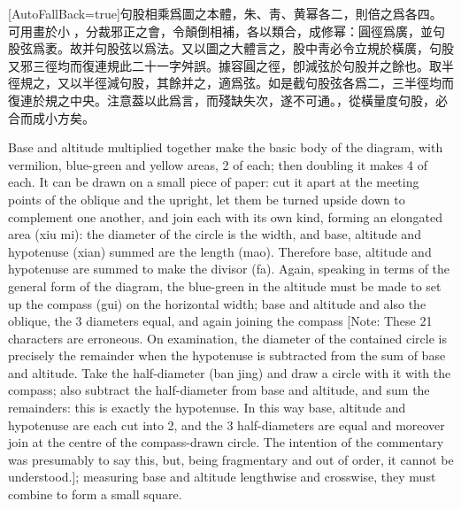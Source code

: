 \documentclass[11pt]{article}
\newcommand{\zhsmall}{\footnotesize\color{black!70}}
\newcommand{\unitlabel}[1]{\marginpar{\raggedleft\tiny\color{gray}#1}}
\newenvironment{unitzh}{\par\CJKfontspec{Noto Serif CJK SC}[AutoFallBack=true]\large\linespread{1.25}\selectfont}{\par}
\newenvironment{uniten}{\par\small\color{black!85}}{\par\medskip}
\begin{document}
\begin{unitzh}\unitlabel{jiuzhang-042.4}句股相乘爲圖之本體，朱、靑、黄幂各二，則倍之爲各四。可用畫於小𥿄，分裁邪正之會，令顛倒相補，各以類合，成修幂：圓徑爲廣，並句股弦爲袤。故并句股弦以爲法。又以圖之大體言之，股中靑必令立規於橫廣，句股又邪三徑均而復連規{\zhsmall 此二十一字舛誤。據容圓之徑，卽減弦於句股并之餘也。取半徑規之，又以半徑減句股，其餘并之，適爲弦。如是截句股弦各爲二，三半徑均而復連於規之中央。注意葢以此爲言，而殘缺失次，遂不可通。}，從橫量度句股，必合而成小方矣。\end{unitzh}
\begin{uniten}Base and altitude multiplied together make the basic body of the diagram, with vermilion, blue-green and yellow areas, 2 of each; then doubling it makes 4 of each. It can be drawn on a small piece of paper: cut it apart at the meeting points of the oblique and the upright, let them be turned upside down to complement one another, and join each with its own kind, forming an elongated area (xiu mi): the diameter of the circle is the width, and base, altitude and hypotenuse (xian) summed are the length (mao). Therefore base, altitude and hypotenuse are summed to make the divisor (fa). Again, speaking in terms of the general form of the diagram, the blue-green in the altitude must be made to set up the compass (gui) on the horizontal width; base and altitude and also the oblique, the 3 diameters equal, and again joining the compass [Note: These 21 characters are erroneous. On examination, the diameter of the contained circle is precisely the remainder when the hypotenuse is subtracted from the sum of base and altitude. Take the half-diameter (ban jing) and draw a circle with it with the compass; also subtract the half-diameter from base and altitude, and sum the remainders: this is exactly the hypotenuse. In this way base, altitude and hypotenuse are each cut into 2, and the 3 half-diameters are equal and moreover join at the centre of the compass-drawn circle. The intention of the commentary was presumably to say this, but, being fragmentary and out of order, it cannot be understood.]; measuring base and altitude lengthwise and crosswise, they must combine to form a small square.\end{uniten}
\end{document}
